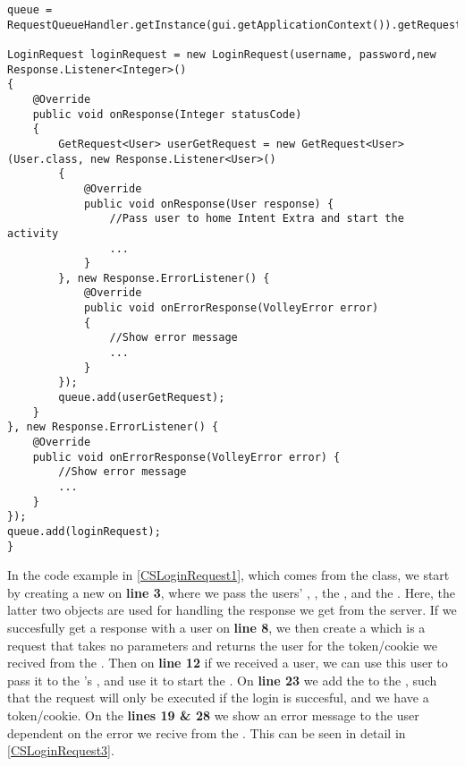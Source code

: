\begin{minipage}[H]{\linewidth}
\begin{lstlisting}[caption = Initial request the respective server response object, label = CSLoginRequest1]
queue = RequestQueueHandler.getInstance(gui.getApplicationContext()).getRequestQueue();

LoginRequest loginRequest = new LoginRequest(username, password,new Response.Listener<Integer>() 
{
	@Override
    public void onResponse(Integer statusCode) 
    {
    	GetRequest<User> userGetRequest = new GetRequest<User>(User.class, new Response.Listener<User>() 
    	{
        	@Override
            public void onResponse(User response) {
            	//Pass user to home Intent Extra and start the activity 
            	...
           	}
        }, new Response.ErrorListener() {
        	@Override
            public void onErrorResponse(VolleyError error) 
            {
            	//Show error message
            	...
            }
        });
        queue.add(userGetRequest);
    }
}, new Response.ErrorListener() {
	@Override
    public void onErrorResponse(VolleyError error) {
    	//Show error message
    	...
    }
});
queue.add(loginRequest);
}
\end{lstlisting}
\end{minipage}

In the code example in \autoref{CSLoginRequest1}, which comes from the
 class, we start by creating a new  on
\textbf{line 3}, where we pass the users' , ,
the , and the . Here, the
latter two objects are used for handling the response we get from
the server.
If we succesfully get a response with a user on \textbf{line 8}, we then create
a  which is a request that takes no parameters and returns
the user for the token/cookie we recived from the . Then on
\textbf{line 12} if we received a user, we can use this user to pass it to
the 's , and use it to start the . On
\textbf{line 23} we add the  to the , such that
the request will only be executed if the login is succesful, and we have a
token/cookie. On the \textbf{lines 19 \& 28} we show an error message to the
user dependent on the error we recive from the . This can be
seen in detail in \autoref{CSLoginRequest3}.\nl


